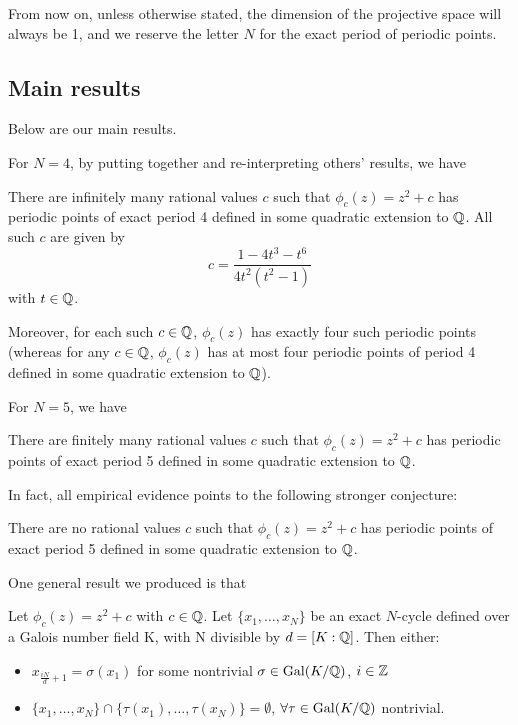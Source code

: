 From now on, unless otherwise stated, the dimension of the projective
space will always be 1, and we reserve the letter $N$ for the exact
period of periodic points.

\subsection{Main results}
\label{subsec:results}

Below are our main results.

For $N = 4$, by putting together and re-interpreting others' results,
we have

\begin{theorem}
  \label{th:n=4-infinite}
  There are infinitely many rational values $c$ such that $\phi_c(z) =
  z^2 + c$ has periodic points of exact period 4 defined in some
  quadratic extension to $\mathbb{Q}$. All such $c$ are given by
  \[
  c = \frac{1 - 4t^3 - t^6}{4t^2(t^2 - 1)}
  \]
  with $t \in \mathbb{Q}$.

  Moreover, for each such $c \in \mathbb{Q}$, $\phi_c(z)$ has exactly four
  such periodic points (whereas for any $c \in \mathbb{Q}$, $\phi_c(z)$ has
  at most four periodic points of period 4 defined in some quadratic
  extension to $\mathbb{Q}$).
\end{theorem}

For $N = 5$, we have

\begin{theorem}
  \label{th:n=5-finite}
  There are finitely many rational values $c$ such that $\phi_c(z) =
  z^2 + c$ has periodic points of exact period 5 defined in some
  quadratic extension to $\mathbb{Q}$.
\end{theorem}

In fact, all empirical evidence points to the following stronger
conjecture:

\begin{conjecture}
  \label{cj:n=5-zero}
  There are no rational values $c$ such that $\phi_c(z) = z^2 + c$ has
  periodic points of exact period 5 defined in some quadratic
  extension to $\mathbb{Q}$.
\end{conjecture}

One general result we produced is that

\begin{theorem}
	Let $\phi_c(z) = z^2 + c$ with $c \in \mathbb{Q}$. Let $\{x_1, \ldots, x_{N}\}$ be
	an exact $N$-cycle defined over a Galois number field K, with N
	divisible by	$d = [K:\mathbb{Q} ]$. Then either: \\
	\begin{itemize}
	\item $x_{\frac{iN}{d}+1} = \sigma(x_1)$ for some nontrivial $\sigma \in
	\mathrm{Gal}(K/\mathbb{Q})$, $i \in \mathbb{Z}$
	\item $\{x_1, \ldots, x_{N}\} \cap \{\tau(x_1), \ldots, \tau(x_{N})\} =
	\emptyset$, $\forall \tau \in \mathrm{Gal}(K/\mathbb{Q})$ nontrivial.
	\end{itemize}
\end{theorem}

